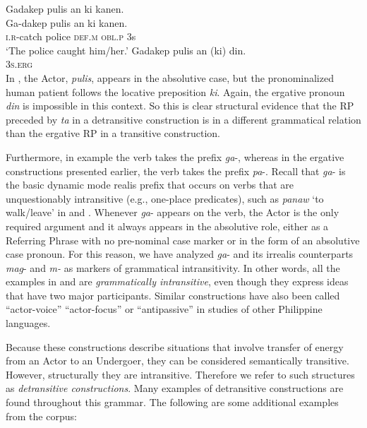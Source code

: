 \ea
    \ea
    \label{ex:gadakeppulisankikanen}
    Gadakep pulis an ki kanen. \\\smallskip
\gll Ga-dakep pulis an ki kanen. \\
    \textsc{i.r}-catch police \textsc{def.m} \textsc{obl.p} 3s\\
    \glt ‘The police caught him/her.’
    \ex
    \label{ex:gadakeppulisan}
    \gll *Gadakep pulis an (ki) din. \\
         {} {} {} {} \textsc{3s.erg} \\
    \z
\z
In , the Actor, \textit{pulis}, appears in the absolutive case, but the pronominalized human patient follows the locative preposition \textit{ki}. Again, the ergative pronoun \textit{din} is impossible in this context. So this is clear structural evidence that the RP preceded by \textit{ta} in a detransitive construction is in a different grammatical relation than the ergative RP in a transitive construction.

Furthermore, in example  the verb takes the prefix \textit{ga}-, whereas in the ergative constructions presented earlier, the verb takes the prefix \textit{pa}{}-. Recall that \textit{ga}{}- is the basic dynamic mode realis prefix that occurs on verbs that are unquestionably intransitive (e.g., one-place predicates), such as \textit{panaw} ‘to walk/leave’ in  and . Whenever \textit{ga}- appears on the verb, the Actor is the only required argument and it always appears in the absolutive role, either as a Referring Phrase with no pre-nominal case marker or in the form of an absolutive case pronoun. For this reason, we have analyzed \textit{ga}{}- and its irrealis counterparts \textit{mag}- and \textit{m-} as markers of grammatical intransitivity. In other words, all the examples in  and  are \textit{grammatically intransitive}, even though they express ideas that have two major participants. Similar constructions have also been called “actor-voice” \citep {himmelmann1991, foley2008, kaufman2017} “actor-focus” \citep{schachter1972} or “antipassive” \citep{bell1979, aldridge2012} in studies of other Philippine languages.

Because these constructions describe situations that involve transfer of energy from an Actor to an Undergoer, they can be considered semantically transitive. However, structurally they are intransitive. Therefore we refer to such structures as \textit{detransitive constructions}. Many examples of detransitive constructions are found throughout this grammar. The following are some additional examples from the corpus:

